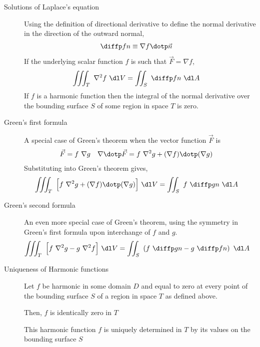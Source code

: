 \begin{description}
    \item[Solutions of Laplace's equation] Using the definition of directional derivative
        to define the normal derivative in the direction of the outward normal,
        \begin{align}
            \diffp fn & \equiv \nabla f \dotp \vec{n}
        \end{align}
        If the underlying scalar function $ f $ is such that $ \vec{F} = \nabla f $,
        \begin{align}
            \iiint_T\ \nabla^2 f\ \dl V & = \iint_S\ \diffp fn\ \dl A
        \end{align}
        If $ f $ is a harmonic function then the integral of the normal derivative over
        the bounding surface $ S $ of some region in space $ T $ is zero.

    \item[Green's first formula] A special case of Green's theorem when the vector
        function $ \vec{F} $ is
        \begin{align}
            \vec{F}              & = f\ \nabla g                                 &
            \nabla \dotp \vec{F} & = f\ \nabla^2 g + (\nabla f) \dotp (\nabla g)
        \end{align}
        Substituting into Green's theorem gives,
        \begin{align}
            \iiint_T\ \Big[f\ \nabla^2 g + (\nabla f) \dotp (\nabla g)\Big]\ \dl V
             & = \iint_S \ f\ \diffp gn\ \dl A
        \end{align}

    \item[Green's second formula] An even more special case of Green's theorem, using
        the symmetry in Green's first formula upon interchange of $ f $ and $ g $.
        \begin{align}
            \iiint_T\ \Big[f\ \nabla^2 g - g\ \nabla^2 f \Big]\ \dl V
             & = \iint_S \ \left( f\ \diffp gn - g\ \diffp fn \right)\ \dl A
        \end{align}

    \item[Uniqueness of Harmonic functions] Let $ f $ be harmonic in some domain $ D $
        and equal to zero at every point of the bounding surface $ S $  of a region in
        space $ T $ as defined above. \par
        Then, $ f $ is identically zero in $ T $ \par
        This harmonic function $ f $ is uniquely determined in $ T $ by its values on the
        bounding surface $ S $
\end{description}

